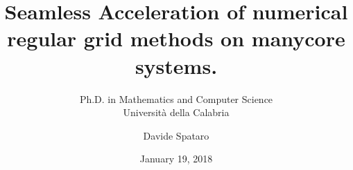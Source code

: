 \documentclass{beamer}
\begin{document}
\title{Seamless Acceleration of numerical regular grid methods on manycore systems.}
\subtitle{Ph.D. in Mathematics and Computer Science\\ Universit\`a della Calabria}
\author{Davide Spataro} 
\date{January 19, 2018}

\frame{\titlepage} 














\end{document}

